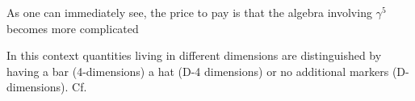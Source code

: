 \documentclass[../FeynCalcManual.tex]{subfiles}
\begin{document}
\begin{Shaded}
\begin{Highlighting}[]
\ExtensionTok{=}\NormalTok{;}
\OperatorTok{[}\OperatorTok{[}\OperatorTok{[}\OperatorTok{,}\OperatorTok{,}\OperatorTok{,}\OperatorTok{,}\OperatorTok{,}\OperatorTok{]}\OperatorTok{[}\OperatorTok{]]]}
\end{Highlighting}
\end{Shaded}

As one can immediately see, the price to pay is that the algebra
involving \(\gamma^5\) becomes more complicated

\begin{Shaded}
\begin{Highlighting}[]
\OperatorTok{[}\OperatorTok{[}\OperatorTok{]}\OperatorTok{[}\OperatorTok{]]}
\end{Highlighting}
\end{Shaded}

In this context quantities living in different dimensions are
distinguished by having a bar (4-dimensions) a hat (D-4 dimensions) or
no additional markers (D-dimensions). Cf.

\begin{Shaded}
\begin{Highlighting}[]
\OperatorTok{\{}\OperatorTok{[}\OperatorTok{],}\OperatorTok{[}\OperatorTok{],}\OperatorTok{[}\OperatorTok{,}\OperatorTok{],}\OperatorTok{[}\OperatorTok{,}\OperatorTok{]\}} 
\OperatorTok{\{}\OperatorTok{[}\OperatorTok{],}\OperatorTok{[}\OperatorTok{],}\OperatorTok{[}\OperatorTok{,}\OperatorTok{],}\OperatorTok{[}\OperatorTok{,}\OperatorTok{]\}} 
\OperatorTok{\{}\OperatorTok{[}\OperatorTok{],}\OperatorTok{[}\OperatorTok{],}\OperatorTok{[}\OperatorTok{,}\OperatorTok{],}\OperatorTok{[}\OperatorTok{,}\OperatorTok{]\}} 
\end{Highlighting}
\end{Shaded}
\end{document}
